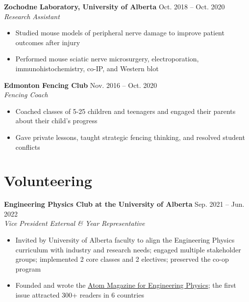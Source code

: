 \documentclass{article}
\begin{document}
\textbf{Zochodne Laboratory, University of Alberta} \hfill Oct. 2018 -- Oct. 2020 \\
\textit{Research Assistant}
\begin{itemize}
    \item Studied mouse models of peripheral nerve damage to improve patient outcomes after injury
    \item Performed mouse sciatic nerve microsurgery, electroporation, immunohistochemistry, co-IP, and Western blot
\end{itemize} \vspace{1em}

\textbf{Edmonton Fencing Club} \hfill Nov. 2016 -- Oct. 2020 \\
\textit{Fencing Coach}
\begin{itemize}
    \item Coached classes of 5-25 children and teenagers and engaged their parents about their child's progress
    \item Gave private lessons, taught strategic fencing thinking, and resolved student conflicts
\end{itemize}


\section*{\textcolor{my_colour}{Volunteering}}
\vspace{-.25em} \hrulefill \vspace{.25em}

\textbf{Engineering Physics Club at the University of Alberta} \hfill Sep. 2021 -- Jun. 2022 \\
\textit{Vice President External \& Year Representative}
\begin{itemize}
    \item Invited by University of Alberta faculty to align the Engineering Physics curriculum with industry and research needs; engaged multiple stakeholder groups; implemented 2 core classes and 2 electives; preserved the co-op program
    \item Founded and wrote the \href{https://atom-winter-2022.netlify.app/}{Atom Magazine for Engineering Physics}; the first issue attracted 300+ readers in 6 countries
\end{itemize} \vspace{1em}
\end{document}
